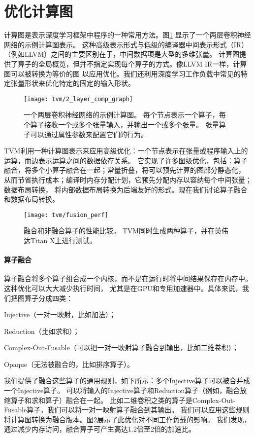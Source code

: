\section{优化计算图}
计算图是表示深度学习框架中程序的一种常用方法。图\ref{fig:2 layer comp graph}
显示了一个两层卷积神经网络的示例计算图表示。
这种高级表示形式与低级的编译器中间表示形式（IR）（例如LLVM）之间的主要区别在于，中间数据项是大型的多维张量。
计算图提供了算子的全局概览，但并不指定实现每个算子的方式。像LLVM IR一样，计算图可以被转换为等价的图
以应用优化。我们还利用深度学习工作负载中常见的特定张量形状来优化特定的固定的输入形状。

\begin{figure}[htbp]
    \centering
    \texttt{[image: tvm/2\_layer\_comp\_graph]}
    \caption{\label{fig:2 layer comp graph}一个两层卷积神经网络的示例计算图。
    每个节点表示一个算子，每个算子接收一个或多个张量输入，并输出一个或多个张量。
    张量算子可以通过属性参数来配置它们的行为。}
\end{figure}

TVM利用一种计算图表示来应用高级优化：一个节点表示在张量或程序输入上的运算，而边表示运算之间的数据依存关系。
它实现了许多图级优化，包括：算子融合，将多个小算子融合在一起；常量折叠，将可以预先计算的图部分静态化，
从而节省执行成本；编译时内存分配计划，它预先分配内存以容纳每个中间张量；数据布局转换，
将内部数据布局转换为后端友好的形式。现在我们讨论算子融合和数据布局转换。

\begin{figure}[htbp]
    \centering
    \texttt{[image: tvm/fusion\_perf]}
    \caption{\label{fig:fusion perf}融合和非融合算子的性能比较。
    TVM同时生成两种算子，并在英伟达Titan X上进行测试。}
\end{figure}

\paragraph{算子融合}
算子融合将多个算子组合成一个内核，而不是在运行时将中间结果保存在内存中。这种优化可以大大减少执行时间，
尤其是在GPU和专用加速器中。具体来说，我们把图算子分成四类：
\begin{enumerate*}
    \item Injective（一对一映射，比如加法）；
    \item Reduction（比如求和）；
    \item Complex-Out-Fusable（可以把一对一映射算子融合到输出，比如二维卷积）；
    \item Opaque（无法被融合的，比如排序算子）。
\end{enumerate*}
我们提供了融合这些算子的通用规则，如下所示：多个Injective算子可以被合并成一个Injective算子。
可以将输入的Injective算子和Reduction算子（例如，融合放缩算子和求和算子）融合在一起。
比如二维卷积之类的算子是Complex-Out-Fusable算子，我们可以将一对一映射算子融合到其输出。
我们可以应用这些规则将计算图转换为融合版本。图\ref{fig:fusion perf}展示了此优化对不同工作负载的影响。
我们发现，通过减少内存访问，融合算子可产生高达1.2倍至2倍的加速比。

